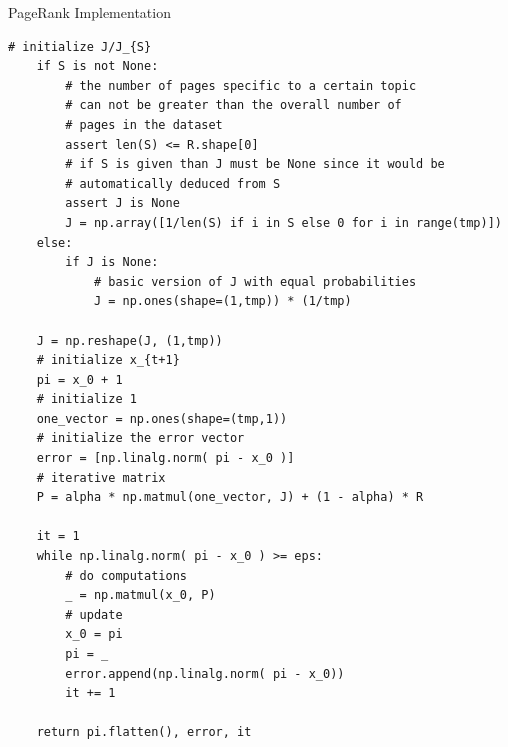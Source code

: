 \documentclass[10pt]{beamer}
\begin{document}
\begin{frame}[fragile]{PageRank Implementation}

\begin{lstlisting}[basicstyle=\tiny]
	# initialize J/J_{S}
    if S is not None:
        # the number of pages specific to a certain topic
        # can not be greater than the overall number of
        # pages in the dataset  
        assert len(S) <= R.shape[0] 
        # if S is given than J must be None since it would be
        # automatically deduced from S
        assert J is None
        J = np.array([1/len(S) if i in S else 0 for i in range(tmp)])
    else:
        if J is None:
            # basic version of J with equal probabilities
            J = np.ones(shape=(1,tmp)) * (1/tmp)
    
    J = np.reshape(J, (1,tmp))
    # initialize x_{t+1}
    pi = x_0 + 1
    # initialize 1
    one_vector = np.ones(shape=(tmp,1))
    # initialize the error vector
    error = [np.linalg.norm( pi - x_0 )]
    # iterative matrix
    P = alpha * np.matmul(one_vector, J) + (1 - alpha) * R
    
    it = 1
    while np.linalg.norm( pi - x_0 ) >= eps:
        # do computations
        _ = np.matmul(x_0, P)
        # update
        x_0 = pi
        pi = _
        error.append(np.linalg.norm( pi - x_0))
        it += 1
        
    return pi.flatten(), error, it
    
\end{lstlisting}
\end{frame}
\end{document}
